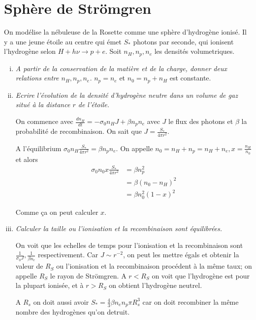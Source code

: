\documentclass[10pt]{report}
\newcommand{\rd}[2]{\frac{d#1}{d#2}}
\begin{document}
\section{Sph\`ere de Str\"omgren}

On mod\'elise la n\'ebuleuse de la Rosette comme une sph\`ere d'hydrog\`ene ionis\'e. Il y a une jeune \'etoile au centre qui \'emet $S_*$ photons par seconde, qui ionisent l'hydrog\`ene selon $H + h\nu \to p + e$. Soit $n_H, n_p, n_e$ les densit\'es volumetriques.

\begin{enumerate}[i)]
    \item \emph{A partir de la conservation de la mati\`ere et de la charge, donner deux relations entre $n_H, n_p, n_e$.} $n_p = n_e$ et $n_0 = n_p + n_H$ est constante.

    \item \emph{Ecrire l'\'evolution de la densit\'e d'hydrog\`ene neutre dans un volume de gaz situ\'e \`a la distance $r$ de l'\'etoile.}

        On commence avec $\rd{n_H}{t} = -\sigma_0n_HJ + \beta n_pn_e$ avec $J$ le flux des photons et $\beta$ la probabilit\'e de recombinaison. On sait que $J = \frac{S_*}{4\pi r^2}$.

        A l'\'equilibrium $\sigma_0 n_H \frac{S_*}{4\pi r^2} = \beta n_pn_e$. On appelle $n_0 = n_H + n_p = n_H + n_e, x = \frac{n_H}{n_0}$ et alors
        \begin{align}
            \sigma_0 n_0 x \frac{S_*}{4\pi r^2} &= \beta n_p^2\\
            &= \beta \left( n_0 - n_H \right)^2\\
            &= \beta n_0^2 \left( 1 - x \right)^2
        \end{align}

        Comme \c{c}a on peut calculer $x$. 
    \item \emph{Calculer la taille ou l'ionisation et la recombinaison sont \'equilibr\'ees.}
        
        On voit que les echelles de temps pour l'ionisation et la recombinaison sont $\frac{1}{\sigma_0J}, \frac{1}{\beta n_e}$ respectivement. Car $J \sim r^{-2}$, on peut les mettre \'egals et obtenir la valeur de $R_S$ ou l'ionisation et la recombinaison proc\'edent \`a la m\^eme taux; on appelle $R_S$ le rayon de Str\"omgren. A $r < R_S$ on voit que l'hydrog\`ene est pour la plupart ionis\'ee, et \`a $r > R_S$ on obtient l'hydrog\`ene neutrel.

        A $R_s$ on doit aussi avoir $S_* = \frac{4}{3}\beta n_en_p \pi R_s^3$ car on doit recombiner la m\^eme nombre des hydrog\`enes qu'on detruit.


\end{enumerate}
\end{document}
